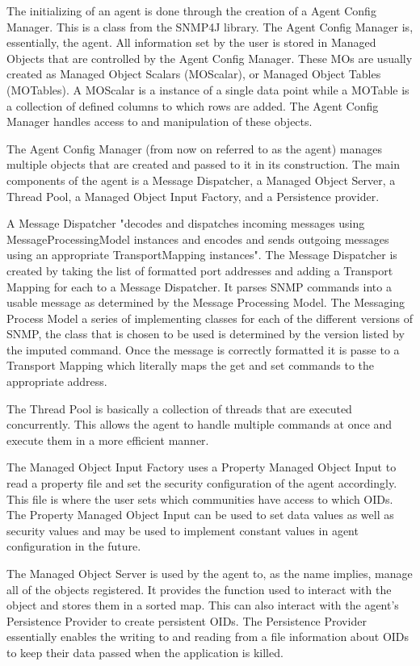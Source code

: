 \documentclass[12pt]{article}
\begin{document}
The initializing of an agent is done through the creation of a Agent Config Manager. This is a class from the SNMP4J library. The Agent Config Manager is, essentially, the agent. All information set by the user is stored in Managed Objects that are controlled by the Agent Config Manager. These MOs are usually created as Managed Object Scalars (MOScalar), or Managed  Object Tables (MOTables). A MOScalar is a instance of a single data point while a MOTable is a collection of defined columns to which rows are added. The Agent Config Manager handles access to and manipulation of these objects.

The Agent Config Manager (from now on referred to as the agent) manages multiple objects that are created and passed to it in its construction. The main components of the agent is a Message Dispatcher, a Managed Object Server, a Thread Pool, a Managed Object Input Factory, and a Persistence provider. 

A Message Dispatcher "decodes and dispatches incoming messages using MessageProcessingModel instances and encodes and sends outgoing messages using an appropriate TransportMapping instances". The Message Dispatcher is created by taking the list of formatted port addresses and adding a Transport Mapping for each to a Message Dispatcher. It parses SNMP commands into a usable message as determined by the Message Processing Model. The Messaging Process Model a series of implementing classes for each of the different versions of SNMP, the class that is chosen to be used is determined by the version listed by the imputed command. Once the message is correctly formatted it is passe to a Transport Mapping which literally maps the get and set commands to the appropriate address. 

The Thread Pool is basically a collection of threads that are executed concurrently. This allows the agent to handle multiple commands at once and execute them in a more efficient manner.

The  Managed Object Input Factory uses a Property Managed Object Input to read a property file and set the security configuration of the agent accordingly. This file is where the user sets which communities have access to which OIDs. The Property Managed Object Input can be used to set data values as well as security values and may be used to implement constant values in agent configuration in the future.

The Managed Object Server is used by the agent to, as the name implies, manage all of the objects registered. It provides the function used to interact with the object and stores them in a sorted map. This can also interact with the agent's Persistence Provider to create persistent OIDs. The Persistence Provider essentially enables the writing to and reading from a file information about OIDs to keep their data passed when the application is killed.
\end{document}
